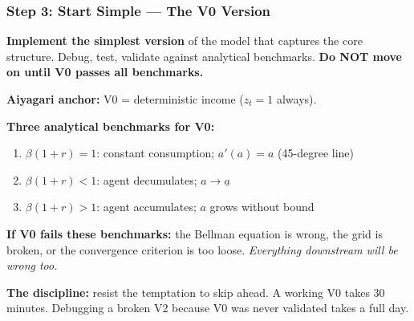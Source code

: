 \documentclass[10pt,english,aspectratio=169]{beamer}
\begin{document}
\begin{frame}
\frametitle{Step 3: Start Simple --- The V0 Version}

\textbf{Implement the simplest version} of the model that captures the core structure. Debug, test, validate against analytical benchmarks. \textbf{Do NOT move on until V0 passes all benchmarks.}

\vspace{0.3cm}

\textbf{Aiyagari anchor:} V0 = deterministic income ($z_t = 1$ always).

\vspace{0.2cm}

\textbf{Three analytical benchmarks for V0:}
\begin{enumerate}
    \item $\beta(1+r) = 1$: constant consumption; $a'(a) = a$ (45-degree line)
    \item $\beta(1+r) < 1$: agent decumulates; $a \to \underline{a}$
    \item $\beta(1+r) > 1$: agent accumulates; $a$ grows without bound
\end{enumerate}

\vspace{0.2cm}

\textbf{If V0 fails these benchmarks:} the Bellman equation is wrong, the grid is broken, or the convergence criterion is too loose. \textit{Everything downstream will be wrong too.}

\vspace{0.2cm}

\textbf{The discipline:} resist the temptation to skip ahead. A working V0 takes 30 minutes. Debugging a broken V2 because V0 was never validated takes a full day.
\end{frame}
\end{document}
